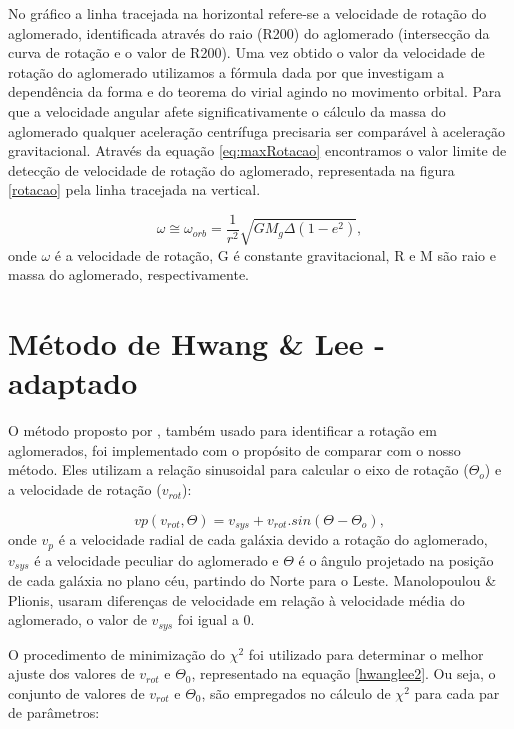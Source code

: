 No gráfico a linha tracejada na horizontal refere-se a velocidade de rotação do aglomerado, identificada através do raio (R200) do aglomerado (intersecção da curva de rotação e o valor de R200). Uma vez obtido o valor da velocidade de rotação do aglomerado utilizamos a fórmula dada por  que investigam a dependência da forma e do teorema do virial agindo no movimento orbital. Para que a velocidade angular afete significativamente o cálculo da massa do aglomerado qualquer aceleração centrífuga precisaria ser comparável à aceleração gravitacional. Através da equação \ref{eq:maxRotacao} encontramos o valor limite de detecção de velocidade de rotação do aglomerado, representada na figura \ref{rotacao} pela linha tracejada na vertical.

\begin{equation}
\omega \cong \omega_{orb} = \frac{1}{r^2} \sqrt{G M_g \Delta (1 - e^2)}, 
\label{eq:maxRotacao}
\end{equation}
onde $\omega$ é a velocidade de rotação, G é constante gravitacional, R e M são raio e massa do aglomerado, respectivamente. 

\section{Método de Hwang \& Lee - adaptado}

O método proposto por , também usado para identificar a rotação em aglomerados, foi implementado com o propósito de comparar com o nosso método. Eles utilizam a relação sinusoidal para calcular o eixo de rotação ($\Theta_o$) e a velocidade de rotação ($v_{rot}$):

\begin{equation}
 vp(v_{rot}, \Theta) = v_{sys} + v_{rot} . sin(\Theta - \Theta_o) ,
 \label{eq:hwanglee1}
\end{equation}
onde $v_p$ é a velocidade radial de cada galáxia devido a rotação do aglomerado, $v_{sys}$ é a velocidade peculiar do aglomerado e $\Theta$ é o ângulo projetado na posição de cada galáxia no plano céu, partindo do Norte para o Leste. Manolopoulou \&  Plionis, usaram diferenças de velocidade em relação à velocidade média do aglomerado, o valor de $v_{sys}$ foi igual a 0.

O procedimento de minimização do $\chi^2$ foi utilizado para determinar o melhor ajuste dos valores de $v_{rot}$ e $\Theta_0$, representado na equação \ref{hwanglee2}. Ou seja, o conjunto de valores de $v_{rot}$ e $\Theta_0$, são empregados no cálculo de $\chi^2$ para cada par de parâmetros:

